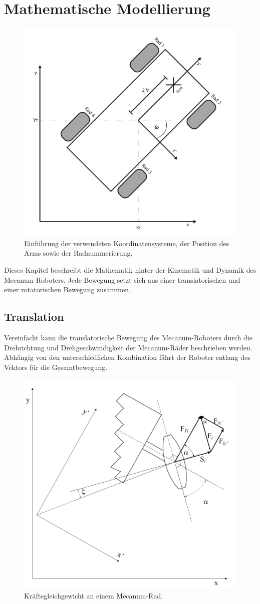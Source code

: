 \section{Mathematische Modellierung}
\begin{figure}
    \centering
    \includegraphics[width=.8\textwidth]{Abbildungen/Koordinaten}
    \caption{Einführung der verwendeten Koordinatensysteme, der Position des Arms sowie der Radnummerierung.}
\end{figure}
Dieses Kapitel beschreibt die Mathematik hinter der Kinematik und Dynamik des Mecanum-Roboters.
Jede Bewegung setzt sich aus einer translatorischen und einer rotatorischen Bewegung zusammen.

\subsection{Translation}
Vereinfacht kann die translatorische Bewegung des Mecanum-Roboters durch die Drehrichtung und Drehgeschwindigkeit der Mecanum-Räder beschrieben werden. Abhängig von den unterschiedlichen Kombination fährt der Roboter entlang des Vektors für die Gesamtbewegung.
\begin{figure}[H]
    \centering
    \includegraphics[width=.6\textwidth]{Abbildungen/Kraefte-am-Rad}
    \caption{Kräftegleichgewicht an einem Mecanum-Rad.}
\end{figure}

